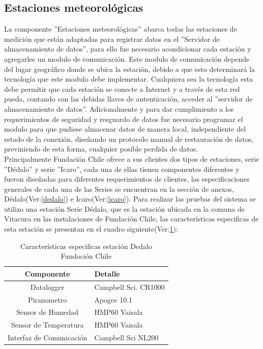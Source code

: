 \subsection{Estaciones meteorológicas}
La componente ''Estaciones meteorológicas'' abarca todas las estaciones de medición que están adaptadas para registrar datos en el ''Servidor de almacenamiento de datos'', para ello fue necesario acondicionar cada estación y agregarles un modulo de comunicación. Este modulo de comunicación depende del lugar geográfico donde se ubica la estación, debido a que esto determinará la tecnología que este modulo debe implementar. Cualquiera sea la tecnología esta debe permitir que cada estación se conecte a Internet y a través de esta red pueda, contando con las debidas llaves de autenticación, acceder al ''servidor de almacenamiento de datos''. Adicionalmente y para dar cumplimiento a los requerimientos de seguridad y resguardo de datos fue necesario programar el modulo para que pudiese almacenar datos de manera local, independiente del estado de la conexión, diseñando un protocolo manual de restauración de datos, previniendo de esta forma, cualquier posible perdida de datos.\\

Principalmente Fundación Chile ofrece a sus clientes dos tipos de estaciones, serie ''Dédalo'' y serie ''Icaro'', cada una de ellas tienen componentes diferentes y fueron diseñadas para diferentes requerimientos de clientes, las especificaciones generales de cada una de las Series se encuentran en la sección de anexos, Dédalo(Ver:\ref{dedalo}) e Icaro(Ver:\ref{icaro}). Para realizar las pruebas del sistema se utilizo una estación Serie Dédalo, que es la estación ubicada en la comuna de Vitacura en las instalaciones de Fundación Chile, las características especificas de esta estación se presentan en el cuadro siguiente(Ver:\ref{estacionDedalo}):\\

\begin{table}[h!]
\label{estacionDedalo}
\caption{Características especificas estación Dedalo Fundación Chile}
\begin{tabular}{| c | p{11cm} |}
        \hline
        \textbf{Componente}  &       \textbf{Detalle}        \\
        \hline
	Datalogger&Campbell Sci. CR1000\\
	\hline
	Piranometro&Apogee 10.1\\
	\hline
	Sensor de Humedad&HMP60 Vaisala\\
	\hline
	Sensor de Temperatura&HMP60 Vaisala\\
	\hline
	Interfaz de Comunicación&Campbell Sci NL200\\
	\hline
\end{tabular}
\end{table}

